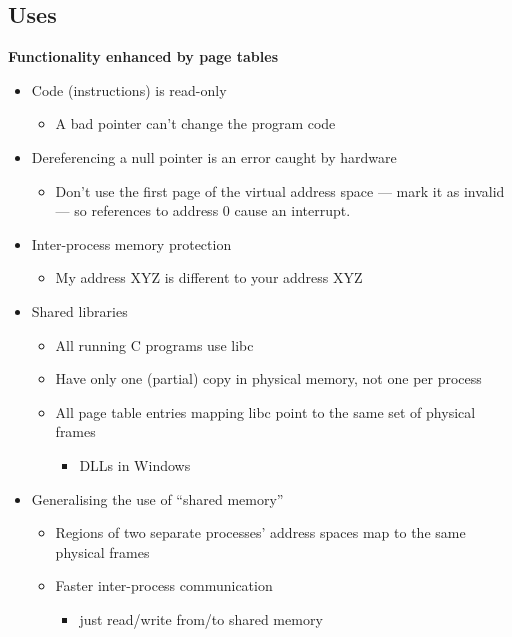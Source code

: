 \documentclass[11pt,a4paper]{article}
\begin{document}
\subsection{Uses}
\textbf{Functionality enhanced by page tables}
\begin{itemize}
    \item Code (instructions) is read-only
        \begin{itemize}
            \item A bad pointer can't change the program code
        \end{itemize}
    \item Dereferencing a null pointer is an error caught by hardware
        \begin{itemize}
            \item Don't use the first page of the virtual address space --- mark it as
                invalid --- so references to address 0 cause an interrupt.
        \end{itemize}
    \item Inter-process memory protection
        \begin{itemize}
            \item My address XYZ is different to your address XYZ
        \end{itemize}
    \item Shared libraries
        \begin{itemize}
            \item All running C programs use libc
            \item Have only one (partial) copy in physical memory, not one per process
            \item All page table entries mapping libc point to the same set of physical frames
                \begin{itemize}
                    \item DLLs in Windows
                \end{itemize}
        \end{itemize}
    \item Generalising the use of ``shared memory''
        \begin{itemize}
            \item Regions of two separate processes' address spaces map to the same physical
                frames
            \item Faster inter-process communication
                \begin{itemize}
                    \item just read/write from/to shared memory

\end{itemize}
\end{itemize}
\end{itemize}
\end{document}
